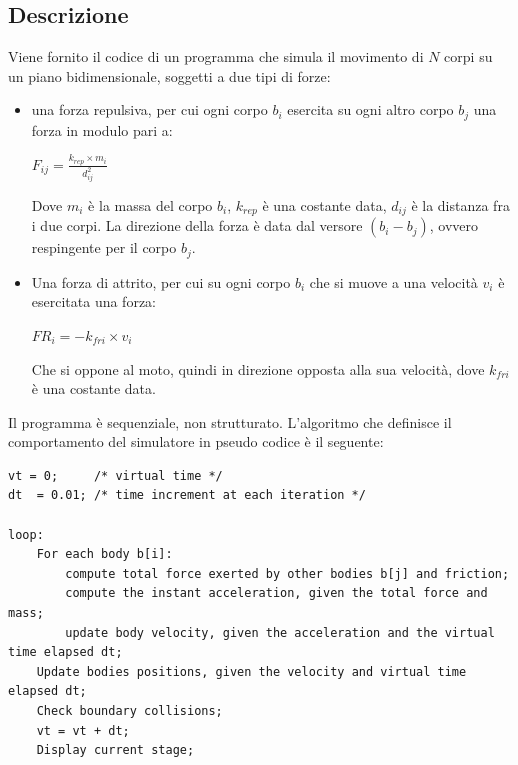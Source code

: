 \documentclass[12pt,a4paper,openright,twoside]{book}
\begin{document}
	
\frontmatter



\tableofcontents   

\mainmatter

\chapter{\introductionname}
\label{chap:introduction}
\section{Descrizione}
Viene fornito il codice di un programma che simula il movimento di $N$ corpi su un piano bidimensionale,
soggetti a due tipi di forze:
\begin{itemize}
	\item una forza repulsiva, per cui ogni corpo $b_{i}$ esercita su ogni altro corpo $b_{j}$ una forza in modulo pari a:
	\begin{center}
		$ F_{ij} = \frac{k_{rep} \times m_{i}}{d^2_{ij}} $
	\end{center}
	Dove $m_{i}$ è la massa del corpo $b_{i}$, $k_{rep}$ è una costante data, $d_{ij}$ è la distanza fra i due corpi.
	La direzione della forza è data dal versore $(b_{i} - b_{j})$, ovvero respingente per il corpo $b_{j}$.
	\item Una forza di attrito, per cui su ogni corpo $b_{i}$ che si muove a una velocità $v_{i}$ è esercitata una forza:
	\begin{center}
		$ FR_{i} = - k_{fri} \times v_{i} $
	\end{center}
	Che si oppone al moto, quindi in direzione opposta alla sua velocità, dove $k_{fri}$ è una costante data.
\end{itemize}
Il programma è sequenziale, non strutturato. 
L'algoritmo che definisce il comportamento del simulatore in pseudo codice è il seguente:
\newpage
\begin{lstlisting}
vt = 0;     /* virtual time */         
dt  = 0.01; /* time increment at each iteration */

loop:
	For each body b[i]:
		compute total force exerted by other bodies b[j] and friction;
		compute the instant acceleration, given the total force and mass;
		update body velocity, given the acceleration and the virtual time elapsed dt;
	Update bodies positions, given the velocity and virtual time elapsed dt;
	Check boundary collisions;
    vt = vt + dt;   
    Display current stage;

\end{lstlisting}
\end{document}
